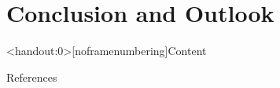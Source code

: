 \documentclass[aspectratio=1610,handout]{beamer} %
\begin{document}
\section[Conclusion]{Conclusion and Outlook}\label{sec:CNO}
\miniframesoff
\begin{frame}<handout:0>[noframenumbering]{Content}
	\tableofcontents[currentsection]
\end{frame}
\miniframeson
\begin{frame}{References}
	\printbibliography[heading=none]
\end{frame}
\end{document}
